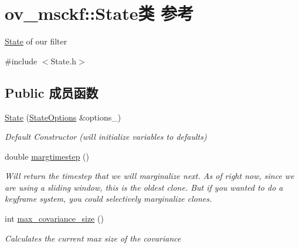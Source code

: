 \hypertarget{classov__msckf_1_1State}{}\section{ov\+\_\+msckf\+:\+:State类 参考}
\label{classov__msckf_1_1State}


\hyperlink{classov__msckf_1_1State}{State} of our filter  




{\ttfamily \#include $<$State.\+h$>$}

\subsection*{Public 成员函数}
\begin{DoxyCompactItemize}
\item 
\hyperlink{classov__msckf_1_1State_ad6098accfeb57e7eb8c8a22bfd45ec0b}{State} (\hyperlink{structov__msckf_1_1StateOptions}{State\+Options} \&options\+\_\+)
\begin{DoxyCompactList}\small\item\em Default Constructor (will initialize variables to defaults) \end{DoxyCompactList}\item 
double \hyperlink{classov__msckf_1_1State_a36420e71ffa54625667eac2a8a345582}{margtimestep} ()
\begin{DoxyCompactList}\small\item\em Will return the timestep that we will marginalize next. As of right now, since we are using a sliding window, this is the oldest clone. But if you wanted to do a keyframe system, you could selectively marginalize clones. \end{DoxyCompactList}\item 
int \hyperlink{classov__msckf_1_1State_a37c45cc1d3d1a3dcc46d3799a997355f}{max\+\_\+covariance\+\_\+size} ()
\begin{DoxyCompactList}\small\item\em Calculates the current max size of the covariance \end{DoxyCompactList}\end{DoxyCompactItemize}
